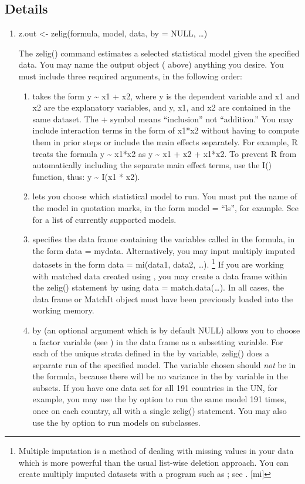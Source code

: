 \documentclass[letterpaper,10pt,english]{sphinxmanual}
\begin{document}
\subsection{Details}
\label{4_statistical_commands:details}\begin{enumerate}
\item {} 
z.out \textless{}- zelig(formula, model, data, by = NULL, …)

The zelig() command estimates a selected statistical model given the
specified data. You may name the output object ( above)
anything you desire. You must include three required arguments, in
the following order:
\begin{enumerate}
\item {} 
 takes the form y \textasciitilde{} x1 + x2, where y is the dependent
variable and x1 and x2 are the explanatory variables, and y, x1,
and x2 are contained in the same dataset. The + symbol means
“inclusion” not “addition.” You may include interaction terms in
the form of x1*x2 without having to compute them in prior steps
or include the main effects separately. For example, R treats the
formula y \textasciitilde{} x1*x2 as y \textasciitilde{} x1 + x2 + x1*x2. To prevent R from
automatically including the separate main effect terms, use the
I() function, thus: y \textasciitilde{} I(x1 * x2).

\item {} 
 lets you choose which statistical model to run. You must
put the name of the model in quotation marks, in the form model =
“ls”, for example. See for a list of currently supported models.

\item {} 
 specifies the data frame containing the variables called
in the formula, in the form data = mydata. Alternatively, you may
input multiply imputed datasets in the form data = mi(data1,
data2, …). \footnote{
Multiple imputation is a method of dealing with missing values in
your data which is more powerful than the usual list-wise deletion
approach. You can create multiply imputed datasets with a program
such as ; see . {[}mi{]}
} If you are working with matched data created using
, you may create a data frame within the zelig() statement by
using data = match.data(…). In all cases, the data frame or
MatchIt object must have been previously loaded into the working
memory.

\item {} 
by (an optional argument which is by default NULL) allows you to
choose a factor variable (see ) in the data frame as a subsetting
variable. For each of the unique strata defined in the by
variable, zelig() does a separate run of the specified model. The
variable chosen should \emph{not} be in the formula, because there will
be no variance in the by variable in the subsets. If you have one
data set for all 191 countries in the UN, for example, you may use
the by option to run the same model 191 times, once on each
country, all with a single zelig() statement. You may also use the
by option to run models on subclasses.


\end{enumerate}
\end{enumerate}
\end{document}
